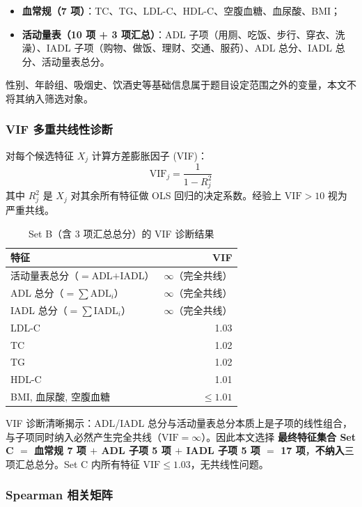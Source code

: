 \documentclass{MathorCupmodeling}
\providecommand{\tightlist}{%
  \setlength{\itemsep}{0pt}\setlength{\parskip}{0pt}}
\begin{document}
\begin{itemize}
\tightlist
\item \textbf{血常规（7 项）}：TC、TG、LDL-C、HDL-C、空腹血糖、血尿酸、BMI；
\item \textbf{活动量表（10 项 + 3 项汇总）}：ADL 子项（用厕、吃饭、步行、穿衣、洗澡）、IADL 子项（购物、做饭、理财、交通、服药）、ADL 总分、IADL 总分、活动量表总分。
\end{itemize}

性别、年龄组、吸烟史、饮酒史等基础信息属于题目设定范围之外的变量，本文不将其纳入筛选对象。

\subsubsection{VIF 多重共线性诊断}

对每个候选特征 $X_j$ 计算方差膨胀因子 (VIF)：
\[
\text{VIF}_j = \frac{1}{1 - R_j^2}
\]
其中 $R_j^2$ 是 $X_j$ 对其余所有特征做 OLS 回归的决定系数。经验上 $\text{VIF} > 10$ 视为严重共线。

\begin{table}[H]
\centering\small
\caption{Set B（含 3 项汇总总分）的 VIF 诊断结果}\label{tab:vif-setB}
\begin{tabular}{@{}l r@{}}
\toprule
特征 & VIF \\
\midrule
活动量表总分（$=$ADL$+$IADL） & $\infty$（完全共线） \\
ADL 总分（$=\sum \text{ADL}_i$） & $\infty$（完全共线） \\
IADL 总分（$=\sum \text{IADL}_i$） & $\infty$（完全共线） \\
LDL-C & 1.03 \\
TC & 1.02 \\
TG & 1.02 \\
HDL-C & 1.01 \\
BMI, 血尿酸, 空腹血糖 & $\le 1.01$ \\
\bottomrule
\end{tabular}
\end{table}

VIF 诊断清晰揭示：ADL/IADL 总分与活动量表总分本质上是子项的线性组合，与子项同时纳入必然产生完全共线（$\text{VIF}=\infty$）。因此本文选择 \textbf{最终特征集合 Set C $=$ 血常规 7 项 $+$ ADL 子项 5 项 $+$ IADL 子项 5 项 $=$ 17 项}，\textbf{不纳入}三项汇总总分。Set C 内所有特征 $\text{VIF} \le 1.03$，无共线性问题。

\subsubsection{Spearman 相关矩阵}
\end{document}
